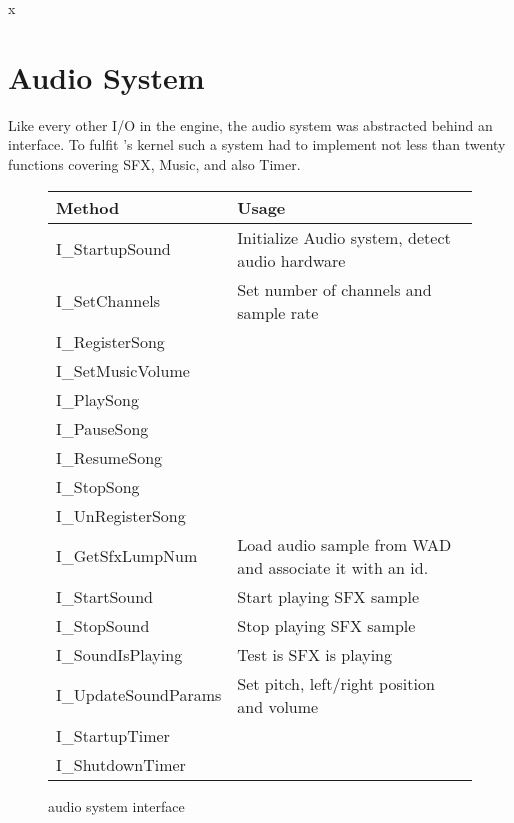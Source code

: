 x\section{Audio System}
\label{dmx_section}
Like every other I/O in the engine, the audio system was abstracted behind an interface. To fulfit \doom's kernel such a system had to implement not less than twenty functions covering SFX, Music, and also Timer.\\
\par
 \begin{figure}[H]
\centering  
\begin{tabularx}{\textwidth}{ L{0.6}  L{1.4}}
  \toprule
  \textbf{Method} &  \textbf{Usage}\\

  \toprule 
  I\_StartupSound & Initialize Audio system, detect audio hardware\\
  I\_SetChannels & Set number of channels and sample rate\\
  \toprule 
   
I\_RegisterSong & \\
I\_SetMusicVolume &\\
I\_PlaySong &\\
I\_PauseSong &\\
I\_ResumeSong &\\
I\_StopSong &\\
I\_UnRegisterSong & \\




  \toprule 
I\_GetSfxLumpNum & Load audio sample from WAD and associate it with an id.\\
I\_StartSound & Start playing SFX sample\\
I\_StopSound & Stop playing SFX sample\\
I\_SoundIsPlaying & Test is SFX is playing\\
I\_UpdateSoundParams & Set pitch, left/right position and volume\\

  \toprule 
  
I\_StartupTimer &\\
I\_ShutdownTimer &\\

  \toprule 



   \toprule
\end{tabularx}
\caption{\doom audio system interface}
\end{figure}



